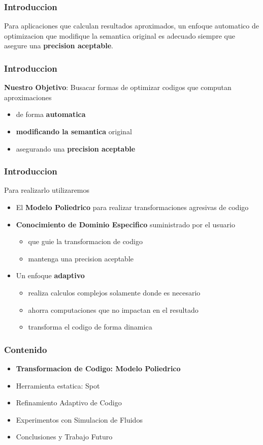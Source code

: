 \documentclass{beamer}\usetheme{Madrid} %
\begin{document}
\begin{frame}
\frametitle{Introduccion}

Para aplicaciones que calculan resultados aproximados, un enfoque automatico 
de optimizacion que modifique la semantica original es adecuado siempre
que asegure una \textbf{precision aceptable}.

\end{frame} 
\begin{frame}
\frametitle{Introduccion}
\textbf{Nuestro Objetivo}: Busacar formas de optimizar codigos que computan
aproximaciones 
\begin{itemize} 
\item de forma \textbf{automatica}
\item \textbf{modificando la semantica} original
\item asegurando una \textbf{precision aceptable} 
\end{itemize}
\end{frame}
\begin{frame}
\frametitle{Introduccion}
Para realizarlo utilizaremos
\begin{itemize} 
\item El \textbf{Modelo Poliedrico} para realizar transformaciones agresivas de codigo
\item \textbf{Conocimiento de Dominio Especifico} suministrado por el usuario
	\begin{itemize} 
	\item que guie la transformacion de codigo	
	\item mantenga una precision aceptable
\end{itemize}
\item Un enfoque \textbf{adaptivo}
	\begin{itemize} 
		\item realiza calculos complejos solamente donde es necesario
		\item ahorra computaciones que no impactan en el resultado
		\item transforma el codigo de forma dinamica
	\end{itemize}
\end{itemize}
\end{frame}
\begin{frame} 
\frametitle{Contenido} 
\begin{itemize}
\item \textbf{Transformacion de Codigo: Modelo Poliedrico}
\item Herramienta estatica: Spot
\item Refinamiento Adaptivo de Codigo
\item Experimentos con Simulacion de Fluidos
\item Conclusiones y Trabajo Futuro
\end{itemize}
\end{frame} 
\end{document}
